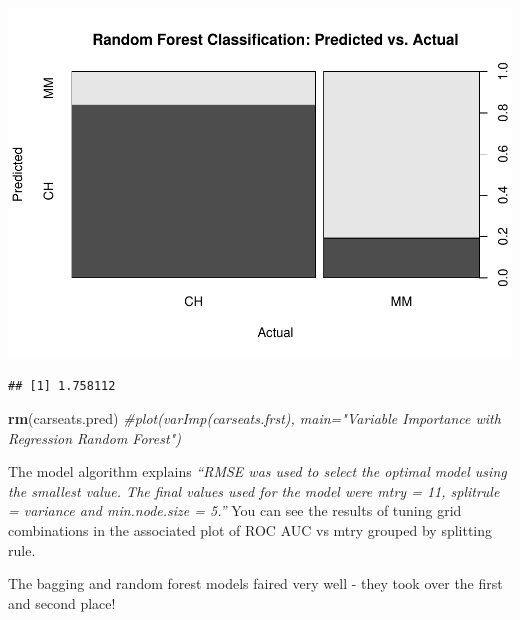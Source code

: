 \documentclass[]{book}
\newenvironment{Shaded}{\begin{snugshade}}{\end{snugshade}}
\newcommand{\CommentTok}[1]{\textcolor[rgb]{0.56,0.35,0.01}{\textit{#1}}}
\newcommand{\DataTypeTok}[1]{\textcolor[rgb]{0.13,0.29,0.53}{#1}}
\newcommand{\KeywordTok}[1]{\textcolor[rgb]{0.13,0.29,0.53}{\textbf{#1}}}
\newcommand{\NormalTok}[1]{#1}
\newcommand{\OperatorTok}[1]{\textcolor[rgb]{0.81,0.36,0.00}{\textbf{#1}}}
\newcommand{\StringTok}[1]{\textcolor[rgb]{0.31,0.60,0.02}{#1}}
\begin{document}
\includegraphics{data-sci_files/figure-latex/unnamed-chunk-84-2.pdf}

\begin{Shaded}
\end{Shaded}

\begin{verbatim}
## [1] 1.758112
\end{verbatim}

\begin{Shaded}
\begin{Highlighting}[]
\KeywordTok{rm}\NormalTok{(carseats.pred)}
\CommentTok{#plot(varImp(carseats.frst), main="Variable Importance with Regression Random Forest")}
\end{Highlighting}
\end{Shaded}

The model algorithm explains \emph{``RMSE was used to select the optimal model using the smallest value. The final values used for the model were mtry = 11, splitrule = variance and min.node.size = 5.''} You can see the results of tuning grid combinations in the associated plot of ROC AUC vs mtry grouped by splitting rule.

The bagging and random forest models faired very well - they took over the first and second place!
\end{document}
